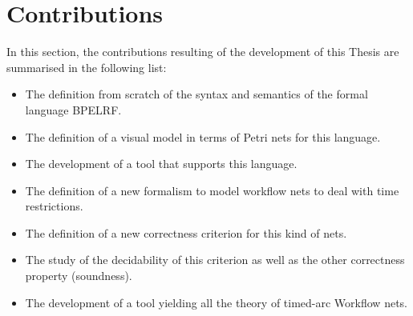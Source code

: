 \section{Contributions}\label{contributions}
%
In this section, the contributions resulting of the development of this Thesis are summarised in the following list:
%
\begin{itemize}
%
\item The definition from scratch of the syntax and semantics of the formal language BPELRF.
%
\item The definition of a visual model in terms of Petri nets for this language.
%
\item The development of a tool that supports this language.
%
\item The definition of a new formalism to model workflow nets to deal with time restrictions.
%
\item The definition of a new correctness criterion for this kind of nets.
%
\item The study of the decidability of this criterion as well as the other correctness property (soundness).
%
\item The development of a tool yielding all the theory of timed-arc Workflow nets.
\end{itemize}
%
